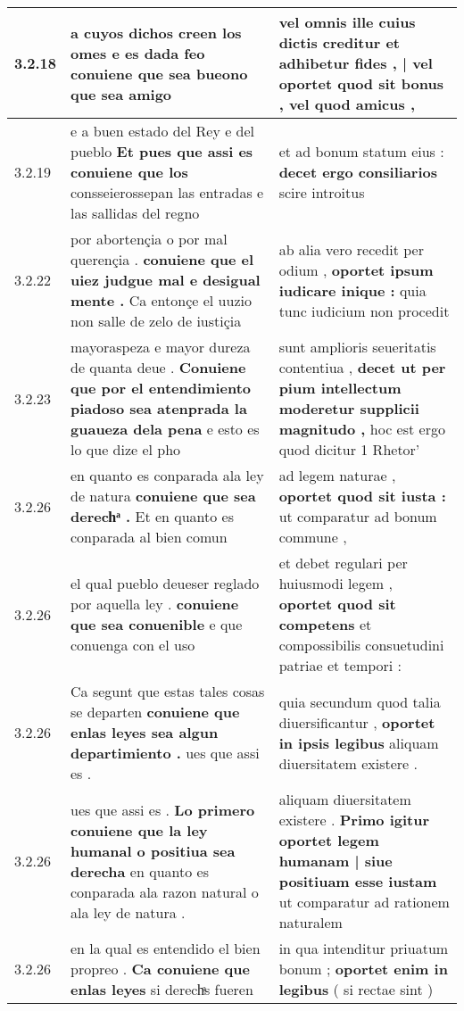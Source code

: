 \begin{tabular}{|p{1cm}|p{6.5cm}|p{6.5cm}|}
3.2.18 & a cuyos dichos creen los omes \textbf{ e es dada feo conuiene que sea bueono } que sea amigo & vel omnis ille cuius dictis creditur \textbf{ et adhibetur fides , | vel oportet quod sit bonus , } vel quod amicus , \\\hline
3.2.19 & e a buen estado del Rey e del pueblo \textbf{ Et pues que assi es conuiene que los } consseierossepan las entradas e las sallidas del regno & et ad bonum statum eius : \textbf{ decet ergo consiliarios } scire introitus \\\hline
3.2.22 & por abortençia o por mal querençia . \textbf{ conuiene que el uiez judgue mal e desigual mente . } Ca entonçe el uuzio non salle de zelo de iustiçia & ab alia vero recedit per odium , \textbf{ oportet ipsum iudicare inique : } quia tunc iudicium non procedit \\\hline
3.2.23 & mayoraspeza e mayor dureza de quanta deue . \textbf{ Conuiene que por el entendimiento piadoso sea atenprada la guaueza dela pena } e esto es lo que dize el pho & sunt amplioris seueritatis contentiua , \textbf{ decet ut per pium intellectum moderetur supplicii magnitudo , } hoc est ergo quod dicitur 1 Rhetor’ \\\hline
3.2.26 & en quanto es conparada ala ley de natura \textbf{ conuiene que sea derechͣ . } Et en quanto es conparada al bien comun & ad legem naturae , \textbf{ oportet quod sit iusta : } ut comparatur ad bonum commune , \\\hline
3.2.26 & el qual pueblo deueser reglado por aquella ley . \textbf{ conuiene que sea conuenible } e que conuenga con el uso & et debet regulari per huiusmodi legem , \textbf{ oportet quod sit competens } et compossibilis consuetudini patriae et tempori : \\\hline
3.2.26 & Ca segunt que estas tales cosas se departen \textbf{ conuiene que enlas leyes sea algun departimiento . } ues que assi es . & quia secundum quod talia diuersificantur , \textbf{ oportet in ipsis legibus } aliquam diuersitatem existere . \\\hline
3.2.26 & ues que assi es . \textbf{ Lo primero conuiene que la ley humanal o positiua sea derecha } en quanto es conparada ala razon natural o ala ley de natura . & aliquam diuersitatem existere . \textbf{ Primo igitur oportet legem humanam | siue positiuam esse iustam } ut comparatur ad rationem naturalem \\\hline
3.2.26 & en la qual es entendido el bien propreo . \textbf{ Ca conuiene que enlas leyes } si derechͣs fueren & in qua intenditur priuatum bonum ; \textbf{ oportet enim in legibus } ( si rectae sint ) \\\hline

\end{tabular}

